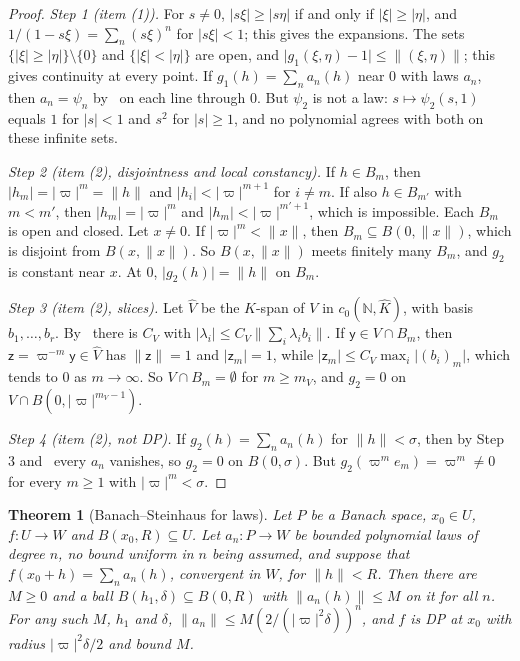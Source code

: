 \documentclass[11pt]{amsart}
\newtheorem{theorem}{Theorem}[section]
\theoremstyle{definition}
\theoremstyle{remark}
\numberwithin{equation}{section}
\newcommand{\N}{\mathbb N}
\newcommand{\abs}[1]{\lvert #1\rvert}
\newcommand{\norm}[1]{\lVert #1\rVert}
\newcommand{\Kh}{\widehat K}
\theoremstyle{plain}
\theoremstyle{definition}
\theoremstyle{plain}
\begin{document}
\begin{proof}
\emph{Step 1 (item (1)).} For $s\ne0$, $\abs{s\xi}\ge\abs{s\eta}$ if and only if $\abs\xi\ge\abs\eta$, and $1/(1-s\xi)=\sum_n(s\xi)^n$ for $\abs{s\xi}<1$; this gives the expansions. The sets $\{\abs\xi\ge\abs\eta\}\setminus\{0\}$ and $\{\abs\xi<\abs\eta\}$ are open, and $\abs{g_1(\xi,\eta)-1}\le\norm{(\xi,\eta)}$; this gives continuity at every point. If $g_1(h)=\sum_na_n(h)$ near $0$ with laws $a_n$, then $a_n=\psi_n$ by~\cite[Lemma~A.1]{I} on each line through $0$. But $\psi_2$ is not a law: $s\mapsto\psi_2(s,1)$ equals $1$ for $\abs s<1$ and $s^2$ for $\abs s\ge1$, and no polynomial agrees with both on these infinite sets.

\emph{Step 2 (item (2), disjointness and local constancy).} If $h\in B_m$, then $\abs{h_m}=\abs\varpi^m=\norm h$ and $\abs{h_i}<\abs\varpi^{m+1}$ for $i\ne m$. If also $h\in B_{m'}$ with $m<m'$, then $\abs{h_m}=\abs\varpi^m$ and $\abs{h_m}<\abs\varpi^{m'+1}$, which is impossible. Each $B_m$ is open and closed. Let $x\ne0$. If $\abs\varpi^m<\norm x$, then $B_m\subseteq B(0,\norm x)$, which is disjoint from $B(x,\norm x)$. So $B(x,\norm x)$ meets finitely many $B_m$, and $g_2$ is constant near $x$. At $0$, $\abs{g_2(h)}=\norm h$ on $B_m$.

\emph{Step 3 (item (2), slices).} Let $\widehat V$ be the $\Kh$-span of $V$ in $c_0(\N,\Kh)$, with basis $b_1,\dots,b_r$. By~\cite[Lemma~A.3]{I} there is $C_V$ with $\abs{\lambda_i}\le C_V\norm{\sum_i\lambda_ib_i}$. If $\mathsf y\in V\cap B_m$, then $\mathsf z=\varpi^{-m}\mathsf y\in\widehat V$ has $\norm{\mathsf z}=1$ and $\abs{\mathsf z_m}=1$, while $\abs{\mathsf z_m}\le C_V\max_i\abs{(b_i)_m}$, which tends to $0$ as $m\to\infty$. So $V\cap B_m=\emptyset$ for $m\ge m_V$, and $g_2=0$ on $V\cap B(0,\abs\varpi^{m_V-1})$.

\emph{Step 4 (item (2), not DP).} If $g_2(h)=\sum_na_n(h)$ for $\norm h<\sigma$, then by Step 3 and~\cite[Lemma~A.1]{I} every $a_n$ vanishes, so $g_2=0$ on $B(0,\sigma)$. But $g_2(\varpi^me_m)=\varpi^m\ne0$ for every $m\ge1$ with $\abs\varpi^m<\sigma$.
\end{proof}

\begin{theorem}[Banach--Steinhaus for laws]\label{dp:thm:banach-steinhaus}
Let $P$ be a Banach space, $x_0\in U$, $f\colon U\to W$ and $B(x_0,R)\subseteq U$. Let $a_n\colon P\to W$ be bounded polynomial laws of degree $n$, no bound uniform in $n$ being assumed, and suppose that $f(x_0+h)=\sum_na_n(h)$, convergent in $W$, for $\norm h<R$. Then there are $M\ge0$ and a ball $B(h_1,\delta)\subseteq B(0,R)$ with $\norm{a_n(h)}\le M$ on it for all $n$. For any such $M$, $h_1$ and $\delta$, $\norm{a_n}\le M(2/(\abs\varpi^2\delta))^n$, and $f$ is DP at $x_0$ with radius $\abs\varpi^2\delta/2$ and bound $M$.
\end{theorem}
\end{document}
